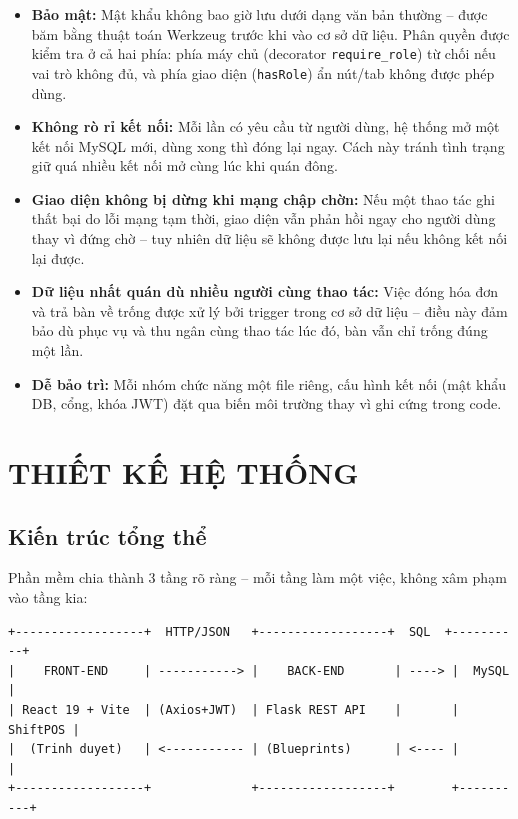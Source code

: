 \documentclass[12pt,a4paper]{report}
\newcommand{\code}[1]{\texttt{#1}}
\begin{document}
\begin{itemize}
  \item \textbf{Bảo mật:} Mật khẩu không bao giờ lưu dưới dạng văn bản thường -- được băm bằng thuật toán Werkzeug trước khi vào cơ sở dữ liệu. Phân quyền được kiểm tra ở cả hai phía: phía máy chủ (decorator \code{require\_role}) từ chối nếu vai trò không đủ, và phía giao diện (\code{hasRole}) ẩn nút/tab không được phép dùng.
  \item \textbf{Không rò rỉ kết nối:} Mỗi lần có yêu cầu từ người dùng, hệ thống mở một kết nối MySQL mới, dùng xong thì đóng lại ngay. Cách này tránh tình trạng giữ quá nhiều kết nối mở cùng lúc khi quán đông.
  \item \textbf{Giao diện không bị dừng khi mạng chập chờn:} Nếu một thao tác ghi thất bại do lỗi mạng tạm thời, giao diện vẫn phản hồi ngay cho người dùng thay vì đứng chờ -- tuy nhiên dữ liệu sẽ không được lưu lại nếu không kết nối lại được.
  \item \textbf{Dữ liệu nhất quán dù nhiều người cùng thao tác:} Việc đóng hóa đơn và trả bàn về trống được xử lý bởi trigger trong cơ sở dữ liệu -- điều này đảm bảo dù phục vụ và thu ngân cùng thao tác lúc đó, bàn vẫn chỉ trống đúng một lần.
  \item \textbf{Dễ bảo trì:} Mỗi nhóm chức năng một file riêng, cấu hình kết nối (mật khẩu DB, cổng, khóa JWT) đặt qua biến môi trường thay vì ghi cứng trong code.
\end{itemize}

\chapter{THIẾT KẾ HỆ THỐNG}

\section{Kiến trúc tổng thể}

Phần mềm chia thành 3 tầng rõ ràng -- mỗi tầng làm một việc, không xâm phạm vào tầng kia:

\begin{Verbatim}[frame=single,fontsize=\small]
+------------------+  HTTP/JSON   +------------------+  SQL  +----------+
|    FRONT-END     | -----------> |    BACK-END       | ----> |  MySQL   |
| React 19 + Vite  | (Axios+JWT)  | Flask REST API    |       | ShiftPOS |
|  (Trinh duyet)   | <----------- | (Blueprints)      | <---- |          |
+------------------+              +------------------+        +----------+
\end{Verbatim}
\end{document}
